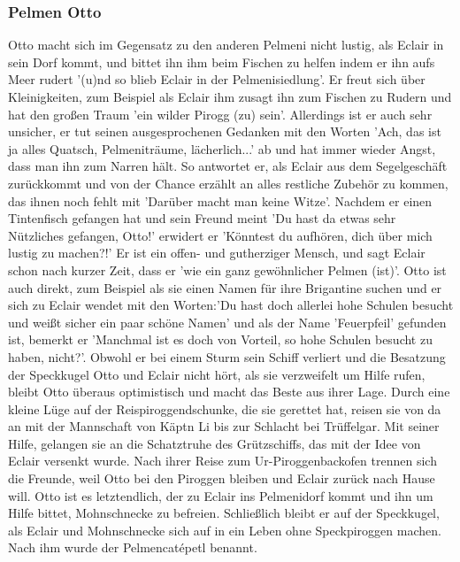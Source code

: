 \subsubsection{Pelmen Otto}
Otto macht sich im Gegensatz zu den anderen Pelmeni nicht lustig, als Eclair in sein Dorf kommt, \cite[S.43f]{pir} und bittet ihn ihm beim Fischen zu helfen indem er ihn aufs Meer rudert \cite[S.44f]{pir} '(u)nd so blieb Eclair in der Pelmenisiedlung'.\cite[S.45]{pir} Er freut sich über Kleinigkeiten, zum Beispiel als Eclair ihm zusagt ihn zum Fischen zu Rudern \cite[S.45]{pir} und hat den großen Traum 'ein wilder Pirogg (zu) sein'.\cite[S.69]{pir} Allerdings ist er auch sehr unsicher,\cite[S.68]{pir} er tut seinen ausgesprochenen Gedanken mit den Worten 'Ach, das ist ja alles Quatsch, Pelmeniträume, lächerlich...' ab und hat immer wieder Angst, dass man ihn zum Narren hält. So antwortet er, als Eclair aus dem Segelgeschäft zurückkommt und von der Chance erzählt an alles restliche Zubehör zu kommen, das ihnen noch fehlt\cite[S.106]{pir} mit 'Darüber macht man keine Witze'.\cite[S.107]{pir} Nachdem er einen Tintenfisch gefangen hat und sein Freund meint 'Du hast da etwas sehr Nützliches gefangen, Otto!'\cite[S.158]{pir} erwidert er 'Könntest du aufhören, dich über mich lustig zu machen?!'\cite[S.158]{pir}
Er ist ein offen- und gutherziger Mensch,\cite[S.68]{pir} und sagt Eclair schon nach kurzer Zeit, dass er 'wie ein ganz gewöhnlicher Pelmen (ist)'.\cite[S.68]{pir} Otto ist auch direkt, zum Beispiel als sie einen Namen für ihre Brigantine suchen und er sich zu Eclair wendet mit den Worten:'Du hast doch allerlei hohe Schulen besucht und weißt sicher ein paar schöne Namen'\cite[S.90]{pir} und als der Name 'Feuerpfeil' gefunden ist, bemerkt er 'Manchmal ist es doch von Vorteil, so hohe Schulen besucht zu haben, nicht?'.\cite[S.93]{pir} Obwohl er bei einem Sturm sein Schiff verliert \cite[S.204]{pir} und die Besatzung der Speckkugel Otto und Eclair nicht hört, als sie verzweifelt um Hilfe rufen, \cite[S.207ff]{pir} bleibt Otto überaus optimistisch und macht das Beste aus ihrer Lage.\cite[S.209]{pir} Durch eine kleine Lüge auf der Reispiroggendschunke,\cite[S.214]{pir} die sie gerettet hat,\cite[S.211f]{pir} reisen sie von da an mit der Mannschaft von Käptn Li \cite[S.214ff]{pir} bis zur Schlacht bei Trüffelgar.\cite[S.317ff]{pir} Mit seiner Hilfe, gelangen sie an die Schatztruhe des Grützschiffs,\cite[S.315f]{pir} das mit der Idee von Eclair versenkt wurde.\cite[S.309ff]{pir} Nach ihrer Reise zum Ur-Piroggenbackofen \cite[S.494]{pir} trennen sich die Freunde, weil Otto bei den Piroggen bleiben und Eclair zurück nach Hause will.\cite[S.504]{pir} Otto ist es letztendlich, der zu Eclair ins Pelmenidorf kommt und ihn um Hilfe bittet, Mohnschnecke zu befreien.\cite[S.555]{pir} Schließlich bleibt er auf der Speckkugel,\cite[S.636]{pir} als Eclair und Mohnschnecke sich auf in ein Leben ohne Speckpiroggen machen.\cite[S.635ff]{pir} Nach ihm wurde der Pelmencatépetl benannt.\cite[S.646]{pir}


